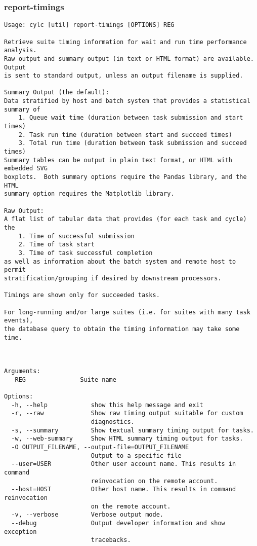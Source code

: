 \subsubsection{report-timings}
\label{report-timings}
\begin{lstlisting}
Usage: cylc [util] report-timings [OPTIONS] REG

Retrieve suite timing information for wait and run time performance analysis.
Raw output and summary output (in text or HTML format) are available.  Output
is sent to standard output, unless an output filename is supplied.

Summary Output (the default):
Data stratified by host and batch system that provides a statistical
summary of
    1. Queue wait time (duration between task submission and start times)
    2. Task run time (duration between start and succeed times)
    3. Total run time (duration between task submission and succeed times)
Summary tables can be output in plain text format, or HTML with embedded SVG
boxplots.  Both summary options require the Pandas library, and the HTML
summary option requires the Matplotlib library.

Raw Output:
A flat list of tabular data that provides (for each task and cycle) the
    1. Time of successful submission
    2. Time of task start
    3. Time of task successful completion
as well as information about the batch system and remote host to permit
stratification/grouping if desired by downstream processors.

Timings are shown only for succeeded tasks.

For long-running and/or large suites (i.e. for suites with many task events),
the database query to obtain the timing information may take some time.



Arguments:
   REG               Suite name

Options:
  -h, --help            show this help message and exit
  -r, --raw             Show raw timing output suitable for custom
                        diagnostics.
  -s, --summary         Show textual summary timing output for tasks.
  -w, --web-summary     Show HTML summary timing output for tasks.
  -O OUTPUT_FILENAME, --output-file=OUTPUT_FILENAME
                        Output to a specific file
  --user=USER           Other user account name. This results in command
                        reinvocation on the remote account.
  --host=HOST           Other host name. This results in command reinvocation
                        on the remote account.
  -v, --verbose         Verbose output mode.
  --debug               Output developer information and show exception
                        tracebacks.
\end{lstlisting}
